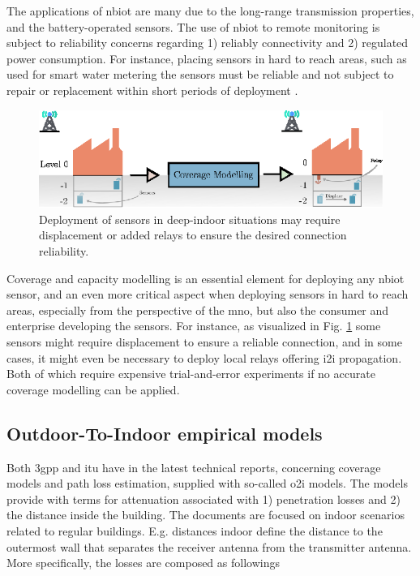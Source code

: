 The applications of \gls{nbiot} are many due to the long-range transmission properties, and the battery-operated sensors. The use of \gls{nbiot} to remote monitoring is subject to reliability concerns regarding 1) reliably connectivity and 2) regulated power consumption. For instance, placing sensors in hard to reach areas, such as used for smart water metering the sensors must be reliable and not subject to repair or replacement within short periods of deployment \cite{Popli2019AChallenges}. 



\begin{figure}
    \centering
    \includegraphics{chapters/part_pathloss/figures/outdoor_to_indoor/approach_figure.eps}
    \caption{Deployment of sensors in deep-indoor situations may require displacement or added relays to ensure the desired connection reliability.}
    \label{fig:outdoor_to_indoor_approach}
\end{figure}

Coverage and capacity modelling is an essential element for deploying any \gls{nbiot} sensor, and an even more critical aspect when deploying sensors in hard to reach areas, especially from the perspective of the \gls{mno}, but also the consumer and enterprise developing the sensors. For instance, as visualized in Fig. \ref{fig:outdoor_to_indoor_approach} some sensors might require displacement to ensure a reliable connection, and in some cases, it might even be necessary to deploy local relays offering \gls{i2i} propagation. Both of which require expensive trial-and-error experiments if no accurate coverage modelling can be applied.  

\subsection{Outdoor-To-Indoor empirical models}
Both \gls{3gpp} and \gls{itu} have in the latest technical reports, concerning coverage models and path loss estimation, supplied with so-called \gls{o2i} models. The models provide with terms for attenuation associated with 1) penetration losses and 2) the distance inside the building. The documents are focused on indoor scenarios related to regular buildings. E.g. distances indoor define the distance to the outermost wall that separates the receiver antenna from the transmitter antenna. More specifically, the losses are composed as followings


